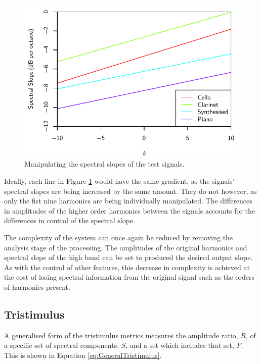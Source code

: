 		\begin{figure}[h!]
			\centering
			\includegraphics{chapter6/Images/MoveSlopes.pdf}
			\caption{Manipulating the spectral slopes of the test signals.}
			\label{fig:MoveSlopes}
		\end{figure}

		Ideally, each line in Figure \ref{fig:MoveSlopes} would have the same gradient, as the signals' spectral
		slopes are being increased by the same amount. They do not however, as only the fist nine harmonics are
		being individually manipulated. The differences in amplitudes of the higher order harmonics between the
		signals accounts for the differences in control of the spectral slope.

		The complexity of the system can once again be reduced by removing the analysis stage of the processing.
		The amplitudes of the original harmonics and spectral slope of the high band can be set to produced the
		desired output slope. As with the control of other features, this decrease in complexity is achieved at the
		cost of losing spectral information from the original signal such as the orders of harmonics present.

	\subsection{Tristimulus}
	\label{sec:FeatureControl-Parameterisation-Tristimulus}
		A generalised form of the tristimulus metrics measures the amplitude ratio, $R$, of a specific set of
		spectral components, $S$, and a set which includes that set, $F$. This is shown in Equation
		\ref{eq:GeneralTristimulus}.

